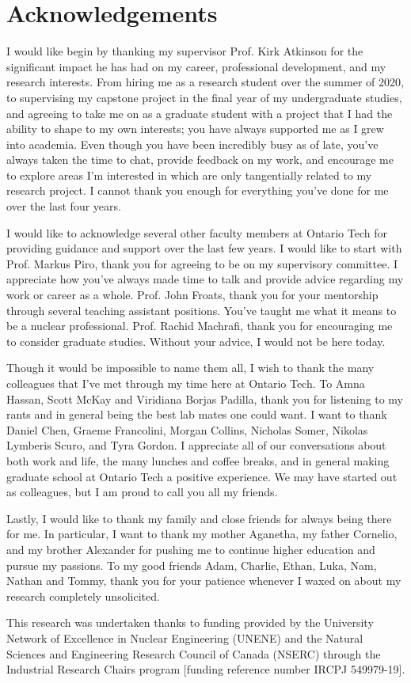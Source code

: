 \chapter*{Acknowledgements}
\label{acknowledgements}

I would like begin by thanking my supervisor Prof. Kirk Atkinson for the significant impact he has had on my career, professional development, and my research interests. From hiring me as a research student over the summer of 2020, to supervising my capstone project in the final year of my undergraduate studies, and agreeing to take me on as a graduate student with a project that I had the ability to shape to my own interests; you have always supported me as I grew into academia. Even though you have been incredibly busy as of late, you've always taken the time to chat, provide feedback on my work, and encourage me to explore areas I'm interested in which are only tangentially related to my research project. I cannot thank you enough for everything you've done for me over the last four years.

I would like to acknowledge several other faculty members at Ontario Tech for providing guidance and support over the last few years. I would like to start with Prof. Markus Piro, thank you for agreeing to be on my supervisory committee. I appreciate how you've always made time to talk and provide advice regarding my work or career as a whole. Prof. John Froats, thank you for your mentorship through several teaching assistant positions. You've taught me what it means to be a nuclear professional. Prof. Rachid Machrafi, thank you for encouraging me to consider graduate studies. Without your advice, I would not be here today. 

Though it would be impossible to name them all, I wish to thank the many colleagues that I've met through my time here at Ontario Tech. To Amna Hassan, Scott McKay and Viridiana Borjas Padilla, thank you for listening to my rants and in general being the best lab mates one could want. I want to thank Daniel Chen, Graeme Francolini, Morgan Collins, Nicholas Somer, Nikolas Lymberis Scuro, and Tyra Gordon. I appreciate all of our conversations about both work and life, the many lunches and coffee breaks, and in general making graduate school at Ontario Tech a positive experience. We may have started out as colleagues, but I am proud to call you all my friends.

Lastly, I would like to thank my family and close friends for always being there for me. In particular, I want to thank my mother Aganetha, my father Cornelio, and my brother Alexander for pushing me to continue higher education and pursue my passions. To my good friends Adam, Charlie, Ethan, Luka, Nam, Nathan and Tommy, thank you for your patience whenever I waxed on about my research completely unsolicited. 

This research was undertaken thanks to funding provided by the University Network of Excellence in Nuclear Engineering (UNENE) and the Natural Sciences and Engineering Research Council of Canada (NSERC) through the Industrial Research Chairs program [funding reference number IRCPJ 549979-19]. 